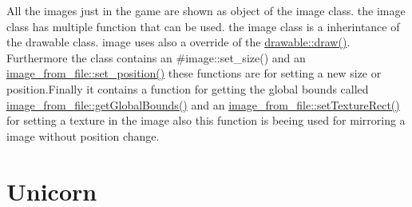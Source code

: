 All the images just in the game are shown as object of the image class. the image class has multiple function that can be used. the image class is a inherintance of the drawable class. image uses also a override of the \hyperlink{classdrawable_a4e49e2c1121704c83ce24c5f48dd910f}{drawable\+::draw()}. Furthermore the class contains an \#image\+::set\+\_\+size() and an \hyperlink{classimage__from__file_a868911f8d541af91290fb8dc56435cd2}{image\+\_\+from\+\_\+file\+::set\+\_\+position()} these functions are for setting a new size or position.\+Finally it contains a function for getting the global bounds called \hyperlink{classimage__from__file_a971a591f906fa5c6e85b4e32cfc3d6a0}{image\+\_\+from\+\_\+file\+::get\+Global\+Bounds()} and an \hyperlink{classimage__from__file_a6561a7e8833e4ca84ba5a31e98802757}{image\+\_\+from\+\_\+file\+::set\+Texture\+Rect()} for setting a texture in the image also this function is beeing used for mirroring a image without position change.\hypertarget{index_unicorn}{}\section{Unicorn}\label{index_unicorn}
